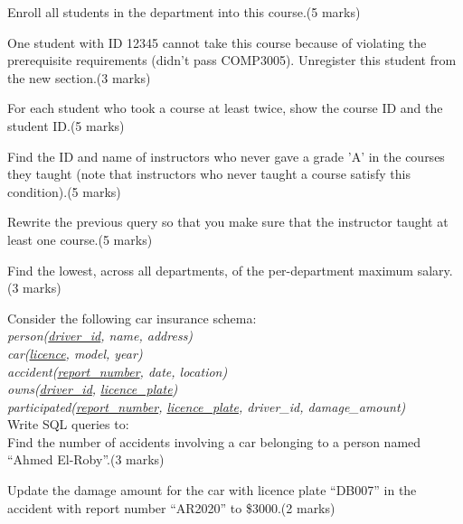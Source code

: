 \documentclass[a4 paper]{article}
\begin{document}
\vspace{10em}

 Enroll all students in the department into this course.\indent(5 marks)\\

\vspace{10em}

 One student with ID 12345 cannot take this course because of violating the prerequisite requirements (didn't pass COMP3005). Unregister this student from the new section.\indent (3 marks)\\

\vspace{10em}

 For each student who took a course at least twice, show the course ID and the student ID.\indent (5 marks)\\

\vspace{10em}


 Find the ID and name of instructors who never gave a grade 'A' in the courses they taught (note that instructors who never taught a course satisfy this condition).\indent (5 marks)\\

\vspace{10em}


 Rewrite the previous query so that you make sure that the instructor taught at least one course.\indent (5 marks)\\

\vspace{10em}

 Find the lowest, across all departments, of the per-department maximum salary.\indent (3 marks)

\vspace{10em}


Consider the following car insurance schema:\\
\emph{person(\underline{driver\_id}, name, address)}\\
\emph{car(\underline{licence}, model, year)}\\
\emph{accident(\underline{report\_number}, date, location)}\\
\emph{owns(\underline{driver\_id}, \underline{licence\_plate})}\\
\emph{participated(\underline{report\_number}, \underline{licence\_plate}, driver\_id, damage\_amount)}\\
Write SQL queries to:\\
 Find the number of accidents involving a car belonging to a person named ``Ahmed El-Roby''.\indent (3 marks)

\vspace{10em}


 Update the damage amount for the car with licence plate ``DB007'' in the accident with report number ``AR2020'' to \$3000.\indent (2 marks)

\vspace{10em}
\end{document}
